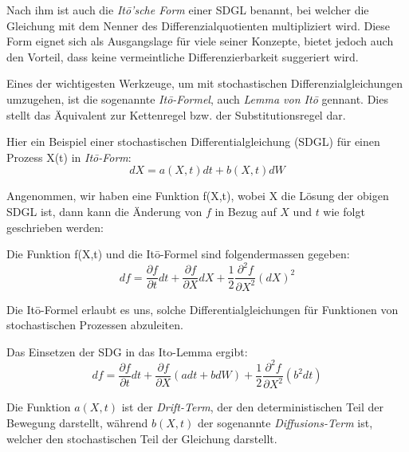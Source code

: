 Nach ihm ist auch die \textit{Itō'sche Form} einer SDGL benannt, bei welcher die Gleichung mit dem Nenner des Differenzialquotienten multipliziert wird. Diese Form eignet sich als Ausgangslage für viele seiner Konzepte, bietet jedoch auch den Vorteil, dass keine vermeintliche Differenzierbarkeit suggeriert wird.


Eines der wichtigesten Werkzeuge, um mit stochastischen Differenzialgleichungen umzugehen, ist die sogenannte \textit{Itō-Formel}, auch \textit{Lemma von Itō} gennant. Dies stellt das Äquivalent zur Kettenregel bzw. der Substitutionsregel dar. %


Hier ein Beispiel einer stochastischen Differentialgleichung (SDGL) für einen Prozess X(t) in \textit{Itō-Form}:
\begin{equation}
	dX = a(X,t) dt + b(X,t) dW
\end{equation}


Angenommen, wir haben eine Funktion f(X,t), wobei X die Lösung der obigen SDGL ist, dann kann die Änderung von $ f $ in Bezug auf $ X $ und $ t $ wie folgt geschrieben werden:

Die Funktion f(X,t) und die Itō-Formel sind folgendermassen gegeben:
\begin{equation}
	df = \frac{\partial f}{\partial t} dt + \frac{\partial f}{\partial X} dX + \frac{1}{2} \frac{\partial^2 f}{\partial X^2} (dX)^2	
\end{equation}

Die Itō-Formel erlaubt es uns, solche Differentialgleichungen für Funktionen von stochastischen Prozessen abzuleiten.

Das Einsetzen der SDG in das Ito-Lemma ergibt:
\begin{equation}
	df = \frac{\partial f}{\partial t} dt + \frac{\partial f}{\partial X} (a dt + b dW) + \frac{1}{2} \frac{\partial^2 f}{\partial X^2} (b^2 dt)
\end{equation}

Die Funktion $ a(X,t) $ ist der \textit{Drift-Term}, der den deterministischen Teil der Bewegung darstellt, während $ b(X,t) $ der sogenannte \textit{Diffusions-Term} ist, welcher den stochastischen Teil der Gleichung darstellt.

